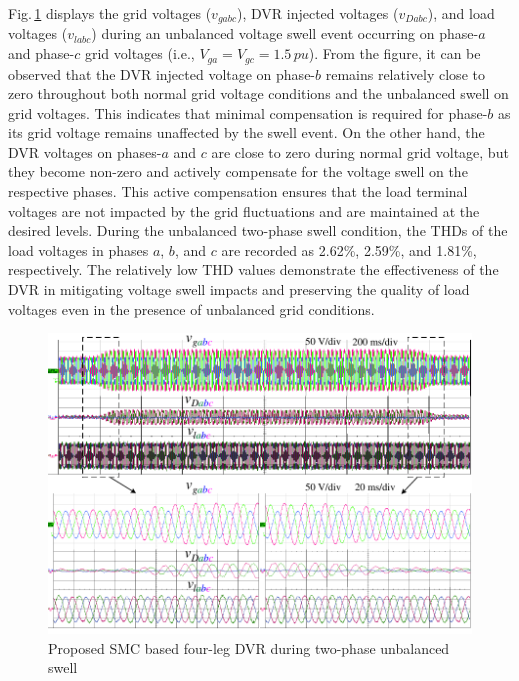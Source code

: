 Fig.\,\ref{fig5.10} displays the grid voltages ($v_{gabc}$), DVR injected voltages ($v_{Dabc}$), and load voltages ($v_{labc}$) during an unbalanced voltage swell event occurring on phase-$a$ and phase-$c$ grid voltages (i.e., $V_{ga}=V_{gc}=1.5\,\si{pu}$).
From the figure, it can be observed that the DVR injected voltage on phase-$b$ remains relatively close to zero throughout both normal grid voltage conditions and the unbalanced swell on grid voltages. This indicates that minimal compensation is required for phase-$b$ as its grid voltage remains unaffected by the swell event.
On the other hand, the DVR voltages on phases-$a$ and $c$ are close to zero during normal grid voltage, but they become non-zero and actively compensate for the voltage swell on the respective phases. This active compensation ensures that the load terminal voltages are not impacted by the grid fluctuations and are maintained at the desired levels.
During the unbalanced two-phase swell condition, the THDs of the load voltages in phases $a$, $b$, and $c$ are recorded as 2.62\%, 2.59\%, and 1.81\%, respectively. The relatively low THD values demonstrate the effectiveness of the DVR in mitigating voltage swell impacts and preserving the quality of load voltages even in the presence of unbalanced grid conditions.
\begin{figure}[t!]   
	\centering
	\includegraphics[scale=1]{figures/Chapter_5/Mine/UnbalancedSwell2_No_IL}
	\caption{Proposed SMC based four-leg DVR during two-phase unbalanced swell} %
	\label{fig5.10}
\end{figure} 
